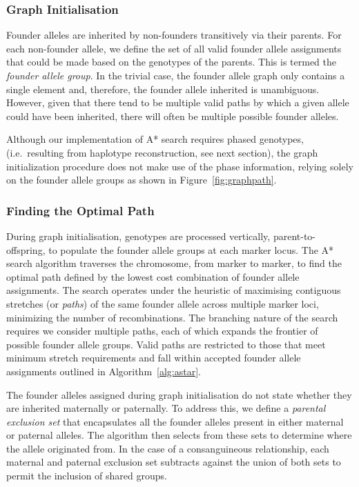 \documentclass{bioinfo}
\numberwithin{equation}{section}
\begin{document}
\begin{methods}
\subsubsection{Graph Initialisation}
\label{alg:initial}

Founder alleles are inherited by non-founders transitively via their parents. For each non-founder allele, we define the set of all valid founder allele assignments that could be made based on the genotypes of the parents. This is termed the {\it founder allele group}. In the trivial case, the founder allele graph only contains a single element and, therefore, the founder allele inherited is unambiguous. However, given that there tend to be multiple valid paths by which a given allele could have been inherited, there will often be multiple possible founder alleles.

Although our implementation of A* search requires phased genotypes, (i.e.~resulting from haplotype reconstruction, see next section), 
the graph initialization procedure does not make use of the phase information, relying solely on the founder allele groups as shown in Figure~\ref{fig:graphpath}. 

\subsubsection{Finding the Optimal Path}

\enlargethispage{0.5cm}

During graph initialisation, genotypes are processed vertically, parent-to-offspring, to populate the founder allele groups at each marker locus. 
The A* search algorithm traverses the chromosome, from marker to marker, to find the optimal path defined by the lowest cost combination of founder allele assignments.
The search operates under the heuristic of maximising contiguous stretches (or \textit{paths}) of the same founder allele across multiple marker loci, minimizing the number of recombinations. The branching nature of the search requires we consider multiple paths, each of which expands the frontier of possible founder allele groups. Valid paths are restricted to those that meet minimum stretch requirements and fall within accepted founder allele assignments outlined in Algorithm~\ref{alg:astar}.

The founder alleles assigned during graph initialisation do not state whether they are inherited maternally or paternally. To address this, we define a \textit{parental exclusion set} that encapsulates all the founder alleles present in either maternal or paternal alleles. The algorithm then selects from these sets to determine where the allele originated from. In the case of a consanguineous relationship, each maternal and paternal exclusion set subtracts against the union of both sets to permit the inclusion of shared groups.


\end{methods}
\end{document}
